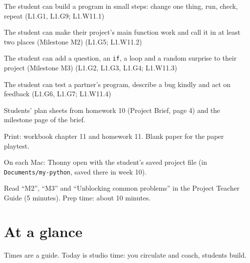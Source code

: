 
\begin{objectives}
  \item The student can build a program in small steps: change one thing, run, check, repeat (L1.G1, L1.G9; L1.W11.1)
  \item The student can make their project's main function work and call it in at least two places (Milestone M2) (L1.G5; L1.W11.2)
  \item The student can add a question, an \texttt{if}, a loop and a random surprise to their project (Milestone M3) (L1.G2, L1.G3, L1.G4; L1.W11.3)
  \item The student can test a partner's program, describe a bug kindly and act on feedback (L1.G6, L1.G7; L1.W11.4)
\end{objectives}

\begin{materials}
  \item Students' plan sheets from homework 10 (Project Brief, page 4) and the milestone page of the brief.
  \item Print: workbook chapter 11 and homework 11. Blank paper for the paper playtest.
  \item On each Mac: Thonny open with the student's saved project file (in \texttt{Documents/my-python}, saved there in week 10).
  \item Read \enquote{M2}, \enquote{M3} and \enquote{Unblocking common problems} in the Project Teacher Guide (5 minutes). Prep time: about 10 minutes.
\end{materials}

\section{At a glance}
Times are a guide. Today is studio time: you circulate and coach, students build.
\begin{timeplan}
\end{timeplan}

